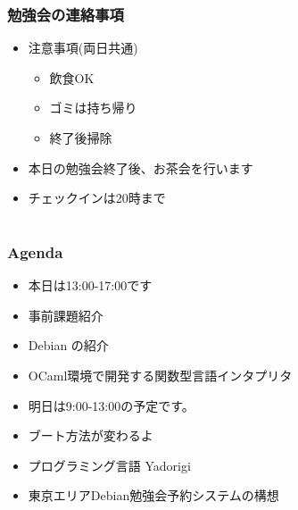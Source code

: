 \frame{\titlepage{}}



\begin{frame}
 \frametitle{勉強会の連絡事項}
\begin{minipage}[t]{0.45\hsize}
  \begin{itemize}
   \item 注意事項(両日共通)
	 \begin{itemize}
	  \item 飲食OK
	  \item ゴミは持ち帰り
	  \item 終了後掃除
	 \end{itemize}
  \end{itemize}

\end{minipage} 
\begin{minipage}[t]{0.45\hsize}
 \begin{itemize}
  \item 本日の勉強会終了後、お茶会を行います
  \item チェックインは20時まで
 \end{itemize}
\end{minipage}
\end{frame}

\section{}
\begin{frame}
 \frametitle{Agenda}
 \begin{minipage}[t]{0.45\hsize}
  \begin{itemize}
   \item 本日は13:00-17:00です
   \item 事前課題紹介
   \item Debian の紹介
   \item OCaml環境で開発する関数型言語インタプリタ
  \end{itemize}
 \end{minipage} 
 \begin{minipage}[t]{0.45\hsize}
  \begin{itemize}
   \item 明日は9:00-13:00の予定です。
   \item ブート方法が変わるよ
   \item プログラミング言語 Yadorigi
   \item 東京エリアDebian勉強会予約システムの構想
  \end{itemize}
 \end{minipage}
\end{frame}

